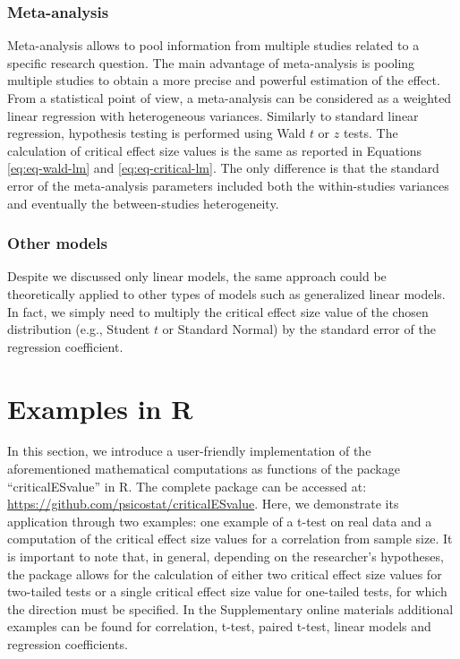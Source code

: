 \documentclass[
  man]{apa7}
\begin{document}
\subsubsection{Meta-analysis}\label{meta-analysis}

Meta-analysis allows to pool information from multiple studies related to a specific research question. The main advantage of meta-analysis is pooling multiple studies to obtain a more precise and powerful estimation of the effect. From a statistical point of view, a meta-analysis can be considered as a weighted linear regression with heterogeneous variances. Similarly to standard linear regression, hypothesis testing is performed using Wald \(t\) or \(z\) tests. The calculation of critical effect size values is the same as reported in Equations \eqref{eq:eq-wald-lm} and \eqref{eq:eq-critical-lm}. The only difference is that the standard error of the meta-analysis parameters included both the within-studies variances and eventually the between-studies heterogeneity.

\subsubsection{Other models}\label{other-models}

Despite we discussed only linear models, the same approach could be theoretically applied to other types of models such as generalized linear models. In fact, we simply need to multiply the critical effect size value of the chosen distribution (e.g., Student \(t\) or Standard Normal) by the standard error of the regression coefficient.

\section{Examples in R}\label{examples-in-r}

In this section, we introduce a user-friendly implementation of the aforementioned mathematical computations as functions of the package ``criticalESvalue'' in R. The complete package can be accessed at: \url{https://github.com/psicostat/criticalESvalue}. Here, we demonstrate its application through two examples: one example of a t-test on real data and a computation of the critical effect size values for a correlation from sample size. It is important to note that, in general, depending on the researcher's hypotheses, the package allows for the calculation of either two critical effect size values for two-tailed tests or a single critical effect size value for one-tailed tests, for which the direction must be specified. In the Supplementary online materials additional examples can be found for correlation, t-test, paired t-test, linear models and regression coefficients.
\end{document}

